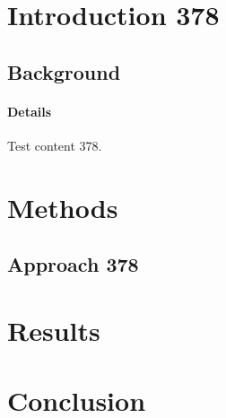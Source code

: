 \documentclass{article}
\begin{document}
\section{Introduction 378}
\subsection{Background}
\paragraph{Details} Test content 378.
\section{Methods}
\subsection{Approach 378}
\section{Results}
\section{Conclusion}
\end{document}
